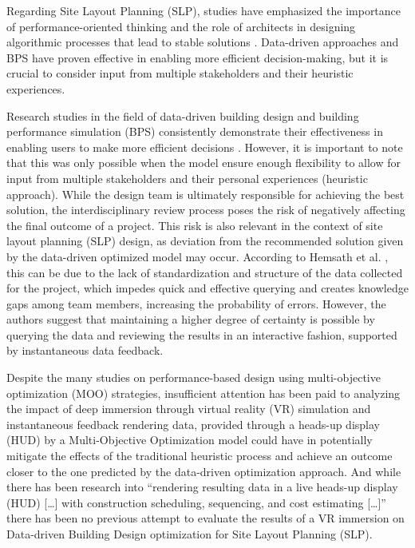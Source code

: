 Regarding Site Layout Planning (SLP), studies have emphasized the importance of performance-oriented thinking and the role of architects in designing algorithmic processes that lead to stable solutions \cite{AlSaggaf2021, Singh2019, Yang2022, Scheer2014}. Data-driven approaches and BPS have proven effective in enabling more efficient decision-making, but it is crucial to consider input from multiple stakeholders and their heuristic experiences.

Research studies in the field of data-driven building design and building performance simulation (BPS) consistently demonstrate their effectiveness in enabling users to make more efficient decisions \cite{Naboni2015}. However, it is important to note that this was only possible when the model ensure enough flexibility to allow for input from multiple stakeholders and their personal experiences (heuristic approach). While the design team is ultimately responsible for achieving the best solution, the interdisciplinary review process poses the risk of negatively affecting the final outcome of a project. This risk is also relevant in the context of site layout planning (SLP) design, as deviation from the recommended solution given by the data-driven optimized model may occur. According to Hemsath et al. \cite{Hemsath2012}, this can be due to the lack of standardization and structure of the data collected for the project, which impedes quick and effective querying and creates knowledge gaps among team members, increasing the probability of errors. However, the authors suggest that maintaining a higher degree of certainty is possible by querying the data and reviewing the results in an interactive fashion, supported by instantaneous data feedback.

Despite the many studies on performance-based design using multi-objective optimization (MOO) strategies, insufficient attention has been paid to analyzing the impact of deep immersion through virtual reality (VR) simulation and instantaneous feedback rendering data, provided through a heads-up display (HUD) by a Multi-Objective Optimization model could have in potentially mitigate the effects of the traditional heuristic process and achieve an outcome closer to the one predicted by the data-driven optimization approach. And while there has been research into “rendering resulting data in a live heads-up display (HUD) […] with construction scheduling, sequencing, and cost estimating […]” \cite{Hemsath2012} there has been no previous attempt to evaluate the results of a VR immersion on Data-driven Building Design optimization for Site Layout Planning (SLP).

